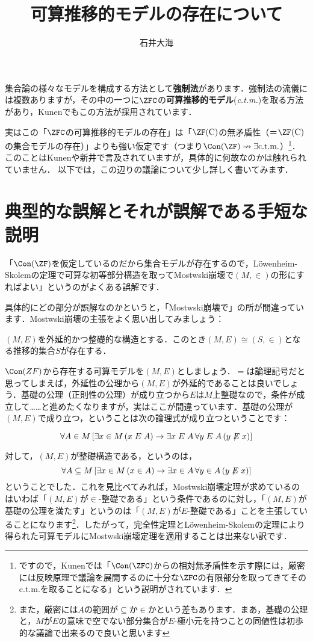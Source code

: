 \documentclass[a4j]{ltjsarticle}
\title{可算推移的モデルの存在について}
\author{石井大海}
\begin{document}
\maketitle

集合論の様々なモデルを構成する方法として\textbf{強制法}があります．強制法の流儀には複数ありますが，その中の一つに$\ZFC$の\textbf{可算推移的モデル}(\textit{c.t.m.})を取る方法があり，Kunen\cite{Kunen:2011}でもこの方法が採用されています．

実はこの「$\ZFC$の可算推移的モデルの存在」は「$\ZF(\mathrm{C})$の無矛盾性（＝$\ZF(\mathrm{C})$の集合モデルの存在）」よりも強い仮定です（つまり$\Con(\ZF) \nrightarrow \exists \text{c.t.m.}$）\footnote{ですので，Kunenでは「$\Con(\ZFC)$からの相対無矛盾性を示す際には，厳密には反映原理で議論を展開するのに十分な$\ZFC$の有限部分を取ってきてそのc.t.m.を取ることになる」という説明がされています．}．このことはKunen\cite{Kunen:2011}や新井\cite{Arai:2011}で言及されていますが，具体的に何故なのかは触れられていません．
以下では，この辺りの議論について少し詳しく書いてみます．

\section{典型的な誤解とそれが誤解である手短な説明}
「$\Con(\ZF)$を仮定しているのだから集合モデルが存在するので，L\"{o}wenheim-Skolemの定理で可算な初等部分構造を取ってMostwski崩壊で$(M, \in)$の形にすればよい」というのがよくある誤解です．

具体的にどの部分が誤解なのかというと，「Mostwski崩壊で」の所が間違っています．Mostwski崩壊の主張をよく思い出してみましょう：

\begin{theorem}[Mostwski]
 $(M, E)$を外延的かつ整礎的な構造とする．このとき$(M, E) \cong (S, \in)$となる推移的集合$S$が存在する．
\end{theorem}

$\Con(ZF)$から存在する可算モデルを$(M, E)$としましょう．$=$は論理記号だと思ってしまえば，外延性の公理から$(M, E)$が外延的であることは良いでしょう．基礎の公理（正則性の公理）が成り立つから$E$は$M$上整礎なので，条件が成立して……と進めたくなりますが，実はここが間違っています．基礎の公理が$(M, E)$で成り立つ，ということは次の論理式が成り立つということです：

\[
 \forall A \in M\, [\exists x \in M\,(x \mathrel{E} A) \rightarrow \exists x \mathrel{E} A \, \forall y \mathrel{E} A\, (y \not\mathrel{E} x)]
\]

対して，$(M, E)$が整礎構造である，というのは，
\[
 \forall A \subseteq M\, [\exists x \in M\,(x \in A) \rightarrow \exists x \in A \, \forall y \in A\, (y \not\mathrel{E} x)]
\]
ということでした．これを見比べてみれば，Mostwski崩壊定理が求めているのはいわば「$(M, E)$が$\in$-整礎である」という条件であるのに対し，「$(M, E)$が基礎の公理を満たす」というのは「$(M, E)$が$E$-整礎である」ことを主張していることになります\footnote{また，厳密には$A$の範囲が$\subseteq$か$\in$かという差もあります．まあ，基礎の公理と，$M$が$E$の意味で空でない部分集合が$E$-極小元を持つことの同値性は初歩的な議論で出来るので良いと思います}．したがって，完全性定理とL\"{o}wenheim-Skolemの定理により得られた可算モデルにMostwski崩壊定理を適用することは出来ない訳です．
\end{document}
